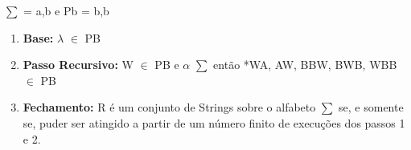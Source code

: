 \begin{question}

   $\sum$ = {a,b} e Pb = {b,b}
	\begin{enumerate}
		
		\item \textbf{Base:} $\lambda$ $\in$ PB
		
		\item \textbf{Passo Recursivo:} W $\in$ PB e $\alpha$ $\sum$ então *WA, AW, BBW, BWB, WBB $\in$ PB
		
		\item \textbf{Fechamento:} R é um conjunto de Strings sobre o alfabeto $\sum$ se, e somente se, puder ser atingido a partir de um número finito de execuções dos passos 1 e 2.
		
	\end{enumerate}
\end{question}
